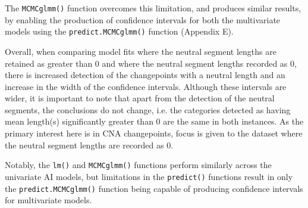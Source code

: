 The \texttt{MCMCglmm()} function overcomes this limitation, and produces similar results, by enabling the production of confidence intervals for both the multivariate models using the \texttt{predict.MCMCglmm()} function (Appendix E). 

Overall, when comparing model fits where the neutral segment lengths are retained as greater than 0 and where the neutral segment lengths recorded as 0, there is increased detection of the changepoints with a neutral length and an increase in the width of the confidence intervals. Although these intervals are wider, it is important to note that apart from the detection of the neutral segments, the conclusions do not change, i.e. the categories detected as having mean length(s) significantly greater than 0 are the same in both instances. As the primary interest here is in CNA changepoints, focus is given to the dataset where the neutral segment lengths are recorded as 0.  

Notably, the \texttt{lm()} and \texttt{MCMCglmm()} functions perform similarly across the univariate AI models, but limitations in the \texttt{predict()} functions result in only the \texttt{predict.MCMCglmm()} function being capable of producing confidence intervals for multivariate models.

